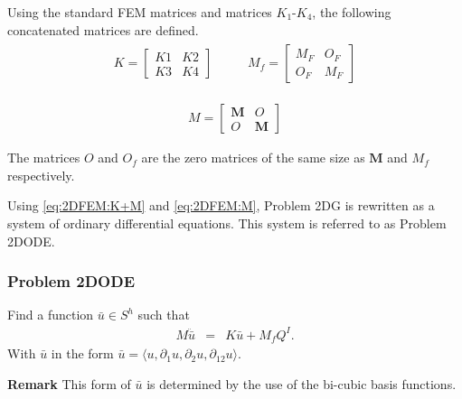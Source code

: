 Using the standard FEM matrices and matrices $K_1$-$K_4$, the following concatenated matrices are defined.
\begin{eqnarray}
	\begin{aligned}
		K = 
		\begin{bmatrix}
			K1 & K2\\
			K3 & K4
		\end{bmatrix}
	\end{aligned}
	\ \ \ \ \ \ \ \ \
	\begin{aligned}
		M_f = 
		\begin{bmatrix}
			M_{F} & O_{F}\\
			O_{F} & M_{F}
		\end{bmatrix}
	\end{aligned}\label{eq:2DFEM:K+M}
\end{eqnarray}

\begin{eqnarray}
	M = 
	\begin{bmatrix}
		\mathbf{M} & O \\
		O & \mathbf{M}
	\end{bmatrix}\label{eq:2DFEM:M}
\end{eqnarray}

The matrices ${O}$ and ${O_f}$ are the zero matrices of the same size as $\mathbf{M}$ and ${M_f}$ respectively.

Using \eqref{eq:2DFEM:K+M} and \eqref{eq:2DFEM:M}, Problem 2DG is rewritten as a system of ordinary differential equations. This system is referred to as Problem 2DODE.

\subsubsection*{Problem 2DODE}
Find a function $\bar{u} \in S^h$ such that
\begin{eqnarray}
	M\ddot{\bar{u}} & = & K\bar{u} + M_{f}Q^I.
\end{eqnarray} With $\bar{u}$ in the form $\bar{u} = \langle u, \partial_1 u, \partial_2 u, \partial_{12} u \rangle$.

\textbf{Remark} This form of $\bar{u}$ is determined by the use of the bi-cubic basis functions.


